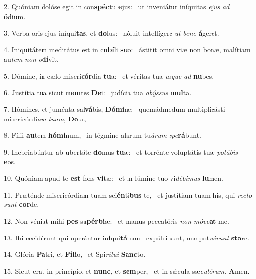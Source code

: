 2. Quóniam dolóse egit in con\textbf{spéc}tu \textbf{e}jus: \ast\  ut inveniátur iníquitas \textit{e}\textit{jus} \textit{ad} \textbf{ó}dium.\

3. Verba oris ejus iníqui\textbf{tas}, et \textbf{do}lus: \ast\  nóluit intellígere \textit{ut} \textit{be}\textit{ne} \textbf{á}geret.\

4. Iniquitátem meditátus est in cu\textbf{bí}li \textbf{su}o: \ast\  ástitit omni viæ non bonæ, malítiam au\textit{tem} \textit{non} \textit{o}\textbf{dí}vit.\

5. Dómine, in cælo miseri\textbf{cór}dia \textbf{tu}a: \ast\  et véritas tua \textit{us}\textit{que} \textit{ad} \textbf{nu}bes.\

6. Justítia tua sicut \textbf{mon}tes \textbf{De}i: \ast\  judícia tua \textit{a}\textit{býs}\textit{sus} \textbf{mul}ta.\

7. Hómines, et juménta sal\textbf{vá}bis, \textbf{Dó}\textbf{mi}ne: \ast\  quemádmodum multiplicásti misericórdi\textit{am} \textit{tu}\textit{am}, \textbf{De}us,\

8. Fílii \textbf{au}tem \textbf{hó}\textbf{mi}num, \ast\  in tégmine alárum tu\textit{á}\textit{rum} \textit{spe}\textbf{rá}bunt.\

9. Inebriabúntur ab ubertáte \textbf{do}mus \textbf{tu}æ: \ast\  et torrénte voluptátis tuæ \textit{po}\textit{tá}\textit{bis} \textbf{e}os.\

10. Quóniam apud te \textbf{est} fons \textbf{vi}tæ: \ast\  et in lúmine tuo vi\textit{dé}\textit{bi}\textit{mus} \textbf{lu}men.\

11. Præténde misericórdiam tuam sci\textbf{én}ti\textbf{bus} te, \ast\  et justítiam tuam his, qui \textit{rec}\textit{to} \textit{sunt} \textbf{cor}de.\

12. Non véniat mihi \textbf{pes} su\textbf{pér}\textbf{bi}æ: \ast\  et manus peccatóris \textit{non} \textit{mó}\textit{ve}\textbf{at} me.\

13. Ibi cecidérunt qui operántur in\textbf{i}qui\textbf{tá}tem: \ast\  expúlsi sunt, nec pot\textit{u}\textit{é}\textit{runt} \textbf{sta}re.\

14. Glória \textbf{Pa}tri, et \textbf{Fí}\textbf{li}o, \ast\  et Spi\textit{rí}\textit{tu}\textit{i} \textbf{Sanc}to.\

15. Sicut erat in princípio, et \textbf{nunc}, et \textbf{sem}per, \ast\  et in sǽcula sæ\textit{cu}\textit{ló}\textit{rum}. \textbf{A}men.\

